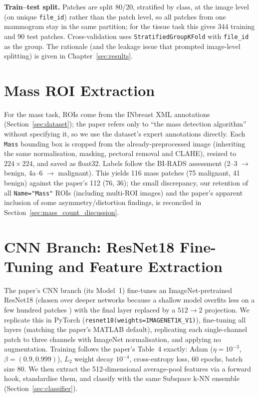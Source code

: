 \textbf{Train--test split.} Patches are split 80/20, stratified by class, at the image level (on unique \texttt{file\_id}) rather than the patch level, so all patches from one mammogram stay in the same partition; for the tissue task this gives 344 training and 90 test patches. Cross-validation uses \texttt{StratifiedGroupKFold} \cite{pedregosa2011scikit} with \texttt{file\_id} as the group. The rationale (and the leakage issue that prompted image-level splitting) is given in Chapter~\ref{sec:results}.


\section{Mass ROI Extraction} \label{sec:mass_rois}

For the mass task, ROIs come from the INbreast XML annotations (Section~\ref{sec:dataset}); the paper refers only to ``the mass detection algorithm'' without specifying it, so we use the dataset's expert annotations directly. Each \texttt{Mass} bounding box is cropped from the already-preprocessed image (inheriting the same normalisation, masking, pectoral removal and CLAHE), resized to $224 \times 224$, and saved as float32. Labels follow the BI-RADS assessment (2--3 $\rightarrow$ benign, 4a--6 $\rightarrow$ malignant). This yields 116 mass patches (75 malignant, 41 benign) against the paper's 112 (76, 36); the small discrepancy, our retention of all \texttt{Name="Mass"} ROIs (including multi-ROI images) and the paper's apparent inclusion of some asymmetry/distortion findings, is reconciled in Section~\ref{sec:mass_count_discussion}.


\section{CNN Branch: ResNet18 Fine-Tuning and Feature Extraction} \label{sec:cnn}

The paper's CNN branch (its Model~1) fine-tunes an ImageNet-pretrained ResNet18 \cite{he2016deep} (chosen over deeper networks because a shallow model overfits less on a few hundred patches \cite{yu2019abnormality}) with the final layer replaced by a $512 \to 2$ projection. We replicate this in PyTorch (\texttt{resnet18(weights=IMAGENET1K\_V1)}), fine-tuning all layers (matching the paper's MATLAB default), replicating each single-channel patch to three channels with ImageNet normalisation, and applying no augmentation. Training follows the paper's Table~4 exactly: Adam ($\eta=10^{-3}$, $\beta=(0.9,0.999)$), $L_2$ weight decay $10^{-4}$, cross-entropy loss, 60 epochs, batch size 80. We then extract the 512-dimensional average-pool features via a forward hook, standardise them, and classify with the same Subspace k-NN ensemble (Section~\ref{sec:classifier}).

